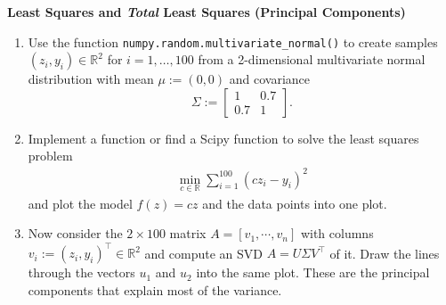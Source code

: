 \textbf{\normalsize Least Squares and \textit{Total} Least Squares (Principal Components)}

\begin{enumerate}
	\item  Use the function \verb|numpy.random.multivariate_normal()| to create samples $(z_i,y_i) \in \mathbb{R}^2$ for $i = 1,\dots, 100$ from a 2-dimensional multivariate normal distribution
	with mean $\mu := (0,0)$ and covariance $$\Sigma := \begin{bmatrix}
	1&0.7\\
	0.7&1
	\end{bmatrix}.$$
	\item Implement a function or find a Scipy function to solve the least squares problem
		\begin{align*}
			\min \limits_{c \in \mathbb{R}} \sum_{i=1}^{100} ( c z_i - y_i )^2
		\end{align*}
		and plot the model $f(z)=cz$ and the data points into one plot.
\item Now consider the $2\times100$ matrix $A = [v_1,\cdots, v_n]$ with columns $v_i := (z_i,y_i)^\top \in \mathbb{R}^2$ and compute an SVD $A=U\Sigma V^\top$ of it. Draw the lines through the vectors $u_1$ and $u_2$ into the same plot. These are the principal components that explain most of the variance.~\\

\end{enumerate}

%

